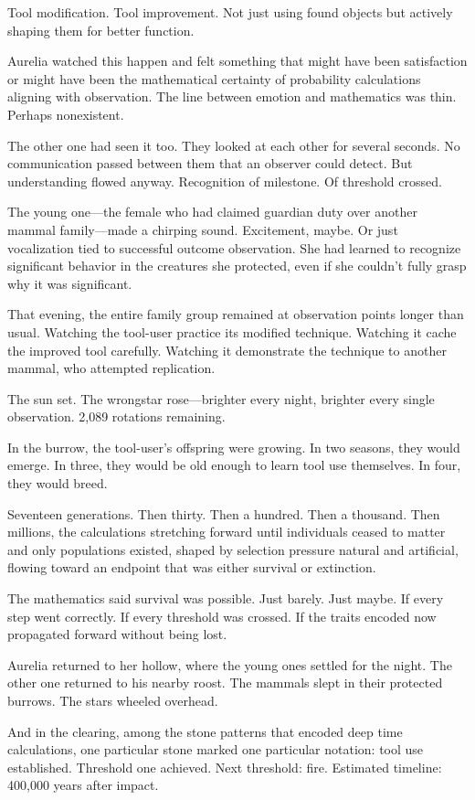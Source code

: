 Tool modification. Tool improvement. Not just using found objects but actively shaping them for better function.

Aurelia watched this happen and felt something that might have been satisfaction or might have been the mathematical certainty of probability calculations aligning with observation. The line between emotion and mathematics was thin. Perhaps nonexistent.

The other one had seen it too. They looked at each other for several seconds. No communication passed between them that an observer could detect. But understanding flowed anyway. Recognition of milestone. Of threshold crossed.

The young one—the female who had claimed guardian duty over another mammal family—made a chirping sound. Excitement, maybe. Or just vocalization tied to successful outcome observation. She had learned to recognize significant behavior in the creatures she protected, even if she couldn't fully grasp why it was significant.

That evening, the entire family group remained at observation points longer than usual. Watching the tool-user practice its modified technique. Watching it cache the improved tool carefully. Watching it demonstrate the technique to another mammal, who attempted replication.

The sun set. The wrongstar rose—brighter every night, brighter every single observation. 2,089 rotations remaining.

In the burrow, the tool-user's offspring were growing. In two seasons, they would emerge. In three, they would be old enough to learn tool use themselves. In four, they would breed.

Seventeen generations. Then thirty. Then a hundred. Then a thousand. Then millions, the calculations stretching forward until individuals ceased to matter and only populations existed, shaped by selection pressure natural and artificial, flowing toward an endpoint that was either survival or extinction.

The mathematics said survival was possible. Just barely. Just maybe. If every step went correctly. If every threshold was crossed. If the traits encoded now propagated forward without being lost.

Aurelia returned to her hollow, where the young ones settled for the night. The other one returned to his nearby roost. The mammals slept in their protected burrows. The stars wheeled overhead.

And in the clearing, among the stone patterns that encoded deep time calculations, one particular stone marked one particular notation: tool use established. Threshold one achieved. Next threshold: fire. Estimated timeline: 400,000 years after impact.

